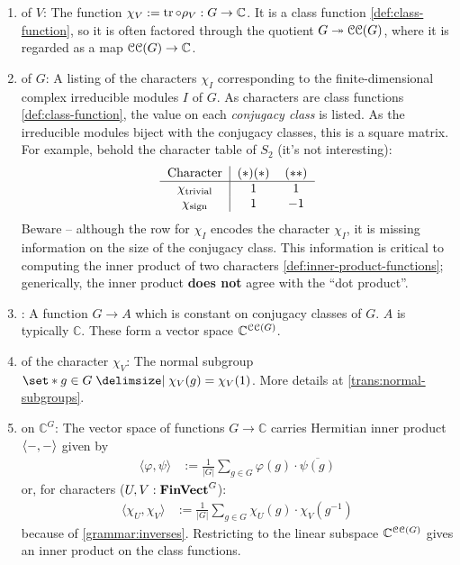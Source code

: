 \begin{enumerate}[leftmargin=*, label=(D\arabic*)]
  \item\label{def:character} {
     of $V$: The function $\chi_V := \operatorname{tr} \circ \rho_V : G \to \mathbb{C}$. It is a class function \ref{def:class-function}, so it is often factored through the quotient $G \twoheadrightarrow \operatorname{\mathcal{CC}}(G)$, where it is regarded as a map $\operatorname{\mathcal{CC}}(G) \to \mathbb{C}$.
  }
  \item\label{def:character-table} {
     of $G$: A listing of the characters $\chi_I$ corresponding to the finite-dimensional complex irreducible modules $I$ of $G$. As characters are class functions \ref{def:class-function}, the value on each \textit{conjugacy class} is listed. As the irreducible modules biject with the conjugacy classes, this is a square matrix. For example, behold the character table of $S_2$ (it's not interesting):
    \begin{align*}
      \begin{tabular}{c|cc}
        Character & $(*)(*)$ & $(**)$ \\
        \hline
        $\chi_{\text{trivial}}$ & $1$ & $1$ \\
        $\chi_{\text{sign}}$ & $1$ & $-1$
      \end{tabular}
    \end{align*}
    \pan Beware -- although the row for $\chi_I$ encodes the character $\chi_I$, it is missing information on the size of the conjugacy class. This information is critical to computing the inner product of two characters \ref{def:inner-product-functions}; generically, the inner product \textbf{does not} agree with the ``dot product''.
  }
  \item\label{def:class-function} {
    : A function $G \to A$ which is constant on conjugacy classes of $G$. $A$ is typically $\mathbb{C}$. These form a vector space $\mathbb{C}^{\operatorname{\mathcal{CC}}(G)}$.
  }
  \item\label{def:kernel} {
     of the character $\chi_V$: The normal subgroup $\set*{ g \in G \given \chi_V (g) = \chi_V (1) }$. More details at \ref{trans:normal-subgroups}.
  }
  \item\label{def:inner-product-functions} {
     on $\mathbb{C}^G$: The vector space of functions $G \to \mathbb{C}$ carries Hermitian inner product $\langle {-} , {-} \rangle$ given by
    \begin{align*}
      \langle \varphi, \psi \rangle
      &:= \frac{1}{\lvert G \rvert} \sum_{g \in G} \varphi(g) \cdot \overline{\psi(g)}
    \end{align*}
    or, for characters ($U, V : \operatorname{\mathbf{FinVect}}^G$):
    \begin{align*}
      \langle \chi_U, \chi_V \rangle
      &:= \frac{1}{\lvert G \rvert} \sum_{g \in G} \chi_U (g) \cdot \chi_V (g^{-1})
    \end{align*}
    because of \ref{grammar:inverses}. Restricting to the linear subspace $\mathbb{C}^{\operatorname{\mathcal{CC}}(G)}$ gives an inner product on the class functions.
  }
\end{enumerate}

